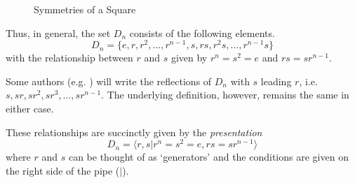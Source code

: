 \begin{figure}[h]
    \centering
    \caption{Symmetries of a Square}
\end{figure}

Thus, in general, the set $D_n$ consists of the following elements.
\[
    D_n = \{e, r, r^2, \dots, r^{n-1}, s, rs, r^2s, \dots, r^{n-1}s\}
\]
with the relationship between $r$ and $s$ given by $r^n = s^2 = e$ and $rs = sr^{n-1}$.

\begin{remark}
    Some authors (e.g. \cite{humphreys_1996}) will write the reflections of $D_n$ with $s$ leading $r$, i.e. $s, sr, sr^2, sr^3, \dots, sr^{n-1}$. The underlying definition, however, remains the same in either case.
\end{remark}

These relationships are succinctly given by the \textit{presentation}
\[
    D_n = \langle r, s \vert r^n = s^2 = e, rs = sr^{n-1} \rangle
\]
where $r$ and $s$ can be thought of as `generators' and the conditions are given on the right side of the pipe ($|$).

